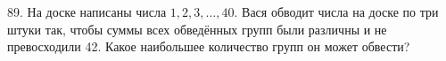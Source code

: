 89. На доске написаны числа $1, 2, 3,\ldots, 40.$ Вася обводит числа на доске по три штуки так, чтобы суммы всех обведённых групп были различны и не превосходили 42. Какое наибольшее количество групп он может обвести?\\
